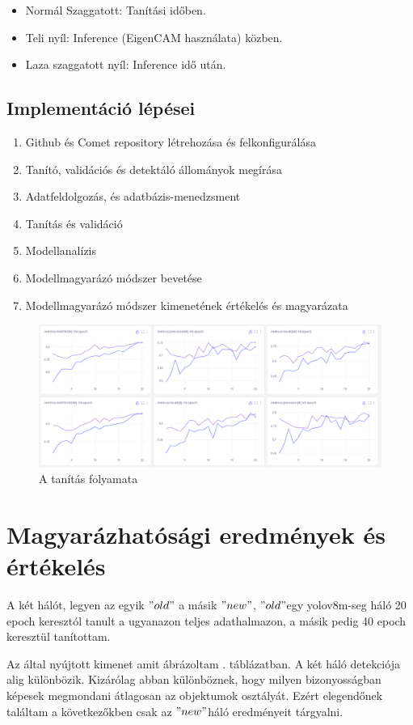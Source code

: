 \documentclass[12pt,oneside,a4paper]{article}
\newcommand{\newsection}[1]{\clearpage\section{#1}}\label{makro}
\theoremstyle{remark}
\newcommand{\oldh}{\( "old" \)}\label{makro2}
\newcommand{\newh}{\( "new" \)}
\begin{document}
	\begin{itemize}\label{itemize}
		\item Normál Szaggatott: Tanítási időben.
		\item Teli nyíl: Inference (EigenCAM használata) közben.\label{Inference}
		\item Laza szaggatott nyíl: Inference idő után.
	\end{itemize}
	\subsection{Implementáció lépései}\label{subsec:impelemntacio}
	\begin{enumerate}
		\item Github és Comet repository létrehozása és felkonfigurálása
		\item Tanító, validációs és detektáló állományok megírása
		\item Adatfeldolgozás, és adatbázis-menedzsment
		\item Tanítás és validáció
		\item Modellanalízis
		\item Modellmagyarázó módszer bevetése
		\item Modellmagyarázó módszer kimenetének értékelés és magyarázata
	\end{enumerate}
	\begin{figure}[ht]
		\centering
		\includegraphics[width=1\linewidth]{modelltanitas}
		\caption{A tanítás folyamata}
		\label{fig:tanitas}
	\end{figure}
	
	\newsection{Magyarázhatósági eredmények és értékelés}\label{sec:magyarazhatosagi-eredmenyek-es-ertekeles}
	A két hálót, legyen az egyik \oldh\label{makrohasznalat} a másik \newh, \oldh egy yolov8m-seg háló 20
	\gls{epoch} keresztól tanult a ugyanazon teljes adathalmazon, a másik pedig 40 \gls{epoch} keresztül tanítottam.
	
	
	Az  által nyújtott kimenet amit ábrázoltam .
	táblázatban\label{hivatkozas}.
	A két háló detekciója alig különbözik.
	Kizárólag abban különböznek, hogy milyen bizonyosságban képesek megmondani átlagosan az objektumok osztályát.
	Ezért elegendőnek találtam a következőkben csak az \newh háló eredményeit tárgyalni.
	
\end{document}
